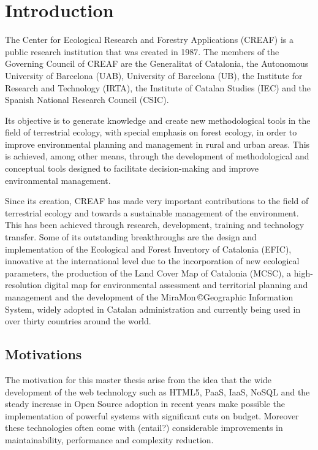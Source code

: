 \chapter{Introduction}

The Center for Ecological Research and Forestry Applications (CREAF) is a public research institution that was created in 1987.  The members of the Governing Council of CREAF are the Generalitat of Catalonia, the Autonomous University of Barcelona (UAB), University of Barcelona (UB), the Institute for Research and Technology (IRTA), the Institute of Catalan Studies (IEC) and the Spanish National Research Council (CSIC).

Its objective is to generate knowledge and create new methodological tools in the field of terrestrial ecology, with special emphasis on forest ecology, in order to improve environmental planning and management in rural and urban areas. This is achieved, among other means, through the development of methodological and conceptual tools designed to facilitate decision-making and improve environmental management.

Since its creation, CREAF has made very important contributions to the field of terrestrial ecology and towards a sustainable management of the environment. This has been achieved through research, development, training and technology transfer. Some of its outstanding breakthroughs are the design and implementation of the Ecological and Forest Inventory of Catalonia (EFIC), innovative at the international level due to the incorporation of new ecological parameters, the production of the Land Cover Map of Catalonia (MCSC), a high-resolution digital map for environmental assessment and territorial planning and management and the development of the MiraMon \copyright  Geographic Information System, widely adopted in Catalan administration and currently being used in over thirty countries around the world.


\section{Motivations}

The motivation for this master thesis arise from the idea that the wide development of the web technology such as HTML5, PaaS, IaaS, NoSQL and the steady increase in Open Source adoption in recent years make possible the implementation of powerful systems with significant cuts on budget. Moreover these technologies often come with (entail?) considerable improvements in maintainability, performance and complexity reduction.

